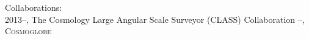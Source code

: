\documentclass[a4paper]{resume}
\begin{document}

\begin{category}{\mbox{Collaborations:}}
\citemnobullet\\
2013--, The Cosmology Large Angular Scale Surveyor (CLASS) Collaboration
--, \textsc{Cosmoglobe}
\end{category}

%   
%   
%   




\end{document}

